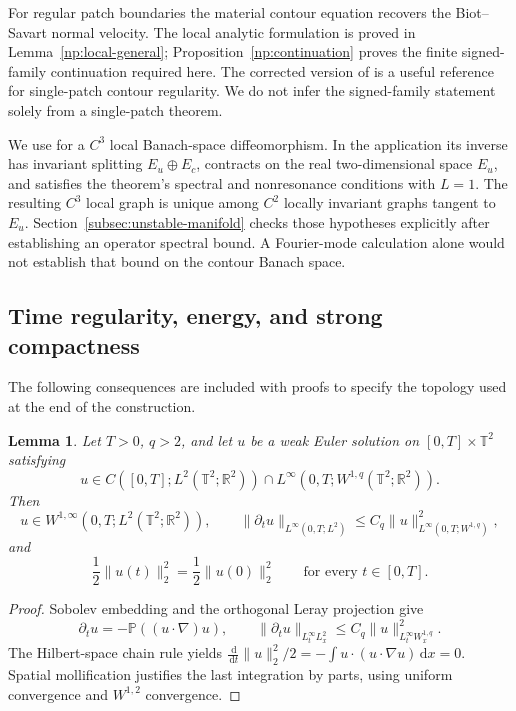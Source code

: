 \documentclass[11pt]{amsart}
\newtheorem{lemma}[theorem]{Lemma}
\theoremstyle{remark}
\numberwithin{equation}{section}
\newcommand{\R}{\mathbb R}
\newcommand{\T}{\mathbb T}
\newcommand{\dd}{\,\mathrm d}
\begin{document}
For regular patch boundaries the material contour equation recovers
the Biot--Savart normal velocity. The local analytic formulation is
proved in Lemma~\ref{np:local-general}; Proposition~\ref{np:continuation}
proves the finite signed-family continuation required here.
The corrected version of \cite{Verdera} is a useful reference for
single-patch contour regularity. We do not infer the signed-family
statement solely from a single-patch theorem.

We use \cite[Theorem~1.2]{CFL2003} for a $C^3$ local Banach-space
diffeomorphism. In the application its inverse has invariant splitting
$E_u\oplus E_c$, contracts on the real two-dimensional space $E_u$,
and satisfies the theorem's spectral and nonresonance conditions with
$L=1$. The resulting $C^3$ local graph is unique among $C^2$ locally
invariant graphs tangent to $E_u$. Section~\ref{subsec:unstable-manifold}
checks those hypotheses explicitly after establishing an operator
spectral bound. A Fourier-mode calculation alone would not establish
that bound on the contour Banach space.

\subsection{Time regularity, energy, and strong compactness}
The following consequences are included with proofs to specify the
topology used at the end of the construction.

\begin{lemma}
\label{cp:energy}
Let $T>0$, $q>2$, and let $u$ be a weak Euler solution on
$[0,T]\times\T^2$ satisfying
\[
 u\in C([0,T];L^2(\T^2;\R^2))
       \cap L^\infty(0,T;W^{1,q}(\T^2;\R^2)).
\]
Then
\[
 u\in W^{1,\infty}(0,T;L^2(\T^2;\R^2)),\qquad
 \|\partial_tu\|_{L^\infty(0,T;L^2)}
 \le C_q\|u\|_{L^\infty(0,T;W^{1,q})}^2,
\]
and
\[
 \frac12\|u(t)\|_2^2=\frac12\|u(0)\|_2^2
 \qquad\text{for every }t\in[0,T].
\]
\end{lemma}
\begin{proof}
Sobolev embedding and the orthogonal Leray projection give
\[
 \partial_tu=-\mathbb P((u\cdot\nabla)u),\qquad
 \|\partial_tu\|_{L^\infty_tL^2_x}
 \le C_q\|u\|_{L^\infty_tW^{1,q}_x}^2 .
\]
The Hilbert-space chain rule yields
$\frac{\dd}{\dd t}\|u\|_2^2/2
=-\int u\cdot(u\cdot\nabla u)\dd x=0$.
Spatial mollification justifies the last integration by parts,
using uniform convergence and $W^{1,2}$ convergence.
\end{proof}
\end{document}

